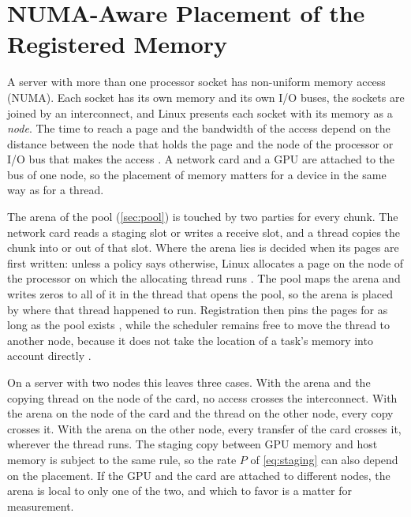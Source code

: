 \section{NUMA-Aware Placement of the Registered Memory}
\label{sec:numa}

A server with more than one processor socket has non-uniform memory access
(NUMA). Each socket has its own memory and its own I/O buses, the sockets are
joined by an interconnect, and Linux presents each socket with its memory as
a \emph{node}. The time to reach a page and the bandwidth of the access
depend on the distance between the node that holds the page and the node of
the processor or I/O bus that makes the access \citep{kernel_numa}. A network
card and a GPU are attached to the bus of one node, so the placement of
memory matters for a device in the same way as for a thread.

The arena of the pool (\cref{sec:pool}) is touched by two parties for every
chunk. The network card reads a staging slot or writes a receive slot, and a
thread copies the chunk into or out of that slot. Where the arena lies is
decided when its pages are first written: unless a policy says otherwise,
Linux allocates a page on the node of the processor on which the allocating
thread runs \citep{kernel_mempolicy}. The pool maps the arena and writes
zeros to all of it in the thread that opens the pool, so the arena is placed
by where that thread happened to run. Registration then pins the pages for as
long as the pool exists \citep{kernel_pin}, while the scheduler remains free
to move the thread to another node, because it does not take the location of
a task's memory into account directly \citep{kernel_numa}.

On a server with two nodes this leaves three cases. With the arena and the
copying thread on the node of the card, no access crosses the interconnect.
With the arena on the node of the card and the thread on the other node,
every copy crosses it. With the arena on the other node, every transfer of
the card crosses it, wherever the thread runs. The staging copy between GPU
memory and host memory is subject to the same rule, so the rate $P$ of
\cref{eq:staging} can also depend on the placement. If the GPU and the card
are attached to different nodes, the arena is local to only one of the two,
and which to favor is a matter for measurement.

